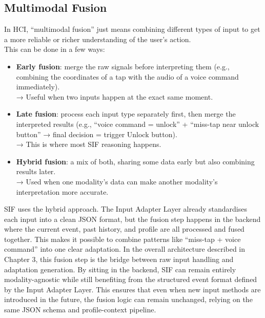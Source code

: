 \documentclass[openany]{book}
\begin{document}
\subsection{Multimodal Fusion}
In HCI, “multimodal fusion” just means combining different types of input to get a more reliable or richer understanding of the user’s action. 
\\This can be done in a few ways:
\begin{itemize}
    \item \textbf{Early fusion}: merge the raw signals before interpreting them (e.g., combining the coordinates of a tap with the audio of a voice command immediately). \\
    → Useful when two inputs happen at the exact same moment.
    \item \textbf{Late fusion}: process each input type separately first, then merge the interpreted results (e.g., “voice command = unlock” + “miss-tap near unlock button” → final decision = trigger Unlock button).\\
    → This is where most SIF reasoning happens.
    \item \textbf{Hybrid fusion}: a mix of both, sharing some data early but also combining results later. \\
    → Used when one modality’s data can make another modality’s interpretation more accurate.
\end{itemize}
SIF uses the hybrid approach. The Input Adapter Layer already standardises each input into a clean JSON format, but the fusion step happens in the backend where the current event, past history, and profile are all processed and fused together. This makes it possible to combine patterns like “miss-tap + voice command” into one clear adaptation. In the overall architecture described in Chapter 3, this fusion step is the bridge between raw input handling and adaptation generation. By sitting in the backend, SIF can remain entirely modality-agnostic while still benefiting from the structured event format defined by the Input Adapter Layer. This ensures that even when new input methods are introduced in the future, the fusion logic can remain unchanged, relying on the same JSON schema and profile-context pipeline.
\end{document}

